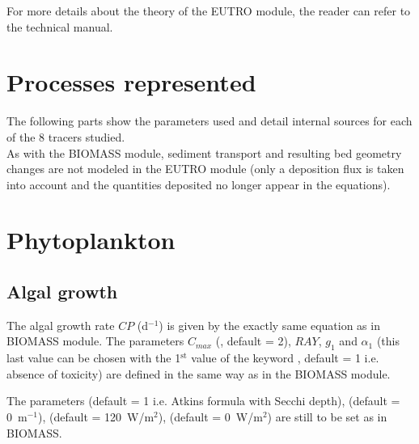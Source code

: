 For more details about the theory of the EUTRO module,
the reader can refer to the \waqtel technical manual.


\section{Processes represented}


The following parts show the parameters used and detail internal sources for each of the 8 tracers studied.\\

As with the BIOMASS module, sediment transport and resulting bed geometry changes
are not modeled in the EUTRO module
(only a deposition flux is taken into account and the quantities deposited no longer appear in the equations).\\


\section{Phytoplankton}

\subsection{Algal growth}

The algal growth rate $CP$ (d$^{-1}$) is given by
the exactly same equation as in BIOMASS module.
The parameters $C_{max}$
(, default = 2),
$RAY$, $g_1$ and $\alpha_1$
(this last value can be chosen with the 1$^{\textrm{st}}$ value of the keyword
, default = 1 i.e. absence of toxicity)
are defined in the same way as in the BIOMASS module.

The parameters
 (default = 1 i.e.
Atkins formula with Secchi depth),
 (default = 0~m$^{-1}$),
 (default = 120~W/m$^2$),
 (default = 0~W/m$^2$)
are still to be set as in BIOMASS.\\


